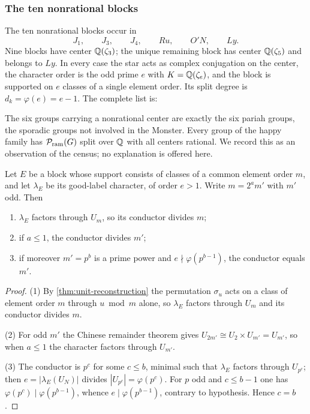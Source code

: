 \subsubsection{The ten nonrational blocks}
\label{sec:nonrational-blocks}

The ten nonrational blocks occur in
\[
 J_1,\qquad J_3,\qquad J_4,\qquad Ru,\qquad O'N,\qquad Ly.
\]
Nine blocks have center \(\mathbb Q(\zeta_3)\); the unique remaining block has
center \(\mathbb Q(\zeta_5)\) and belongs to \(Ly\).  In every case the star acts as
complex conjugation on the center, the character order is the odd prime
\(e\) with \(K=\mathbb Q(\zeta_e)\), and the block is supported on \(e\)
classes of a single element order.  Its split degree is
\(d_k=\varphi(e)=e-1\).  The complete list is:



\begin{remark}
\label{rem:pariahs}
The six groups carrying a nonrational center are exactly the six pariah
groups, the sporadic groups not involved in the Monster.  Every group of
the happy family has \(\mathcal P_{\mathrm{ram}}(G)\) split over \(\mathbb Q\) with all centers
rational.  We record this as an observation of the census; no explanation
is offered here.
\end{remark}


\begin{proposition}
\label{prop:conductor-determined}
Let \(E\) be a block whose support consists of classes of a common element
order \(m\), and let \(\lambda_E\) be its good-label character, of order
\(e>1\).  Write \(m=2^am'\) with \(m'\) odd.  Then
\begin{enumerate}
\item \(\lambda_E\) factors through \(U_m\), so its conductor divides \(m\);
\item if \(a\leq1\), the conductor divides \(m'\);
\item if moreover \(m'=p^b\) is a prime power and
\(e\nmid\varphi(p^{b-1})\), the conductor equals \(m'\).
\end{enumerate}
\end{proposition}

\begin{proof}
(1) By \cref{thm:unit-reconstruction} the permutation \(\sigma_u\) acts on a
class of element order \(m\) through \(u\bmod m\) alone, so \(\lambda_E\)
factors through \(U_m\) and its conductor divides \(m\).

(2) For odd \(m'\) the Chinese remainder theorem gives
\(U_{2m'}\cong U_2\times U_{m'}=U_{m'}\), so when \(a\leq1\) the character
factors through \(U_{m'}\).

(3) The conductor is \(p^c\) for some \(c\leq b\), minimal such that
\(\lambda_E\) factors through \(U_{p^c}\); then
\(e=|\lambda_E(U_N)|\) divides \(|U_{p^c}|=\varphi(p^c)\).  For \(p\) odd and
\(c\leq b-1\) one has \(\varphi(p^c)\mid\varphi(p^{b-1})\), whence
\(e\mid\varphi(p^{b-1})\), contrary to hypothesis.  Hence \(c=b\).
\end{proof}


